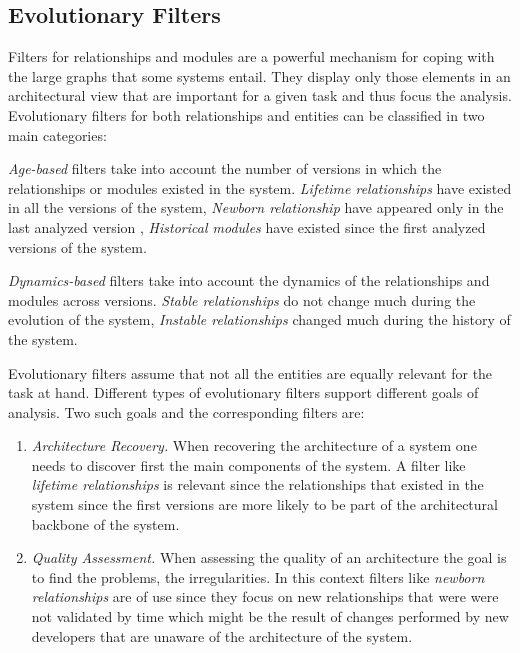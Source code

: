 \documentclass[preprint,12pt]{elsarticle}
\begin{document}
\subsection {Evolutionary Filters}

Filters for relationships and modules are a powerful mechanism for coping with the large graphs that some systems entail. They display only those elements in an architectural view that are important for a given task and thus focus the analysis. Evolutionary filters for both relationships and entities can be classified in two main categories:

\begin{description}
\item {\em Age-based} filters take into account the number of versions in which the relationships or modules existed in the system. {\em Lifetime relationships} have existed in all the versions of the system, {\em Newborn relationship} have appeared only in the last analyzed version \cite{lungu-relevo}, {\em Historical modules} have existed since the first analyzed versions of the system.
\item {\em Dynamics-based} filters take into account the dynamics of the relationships and modules across versions. {\em Stable relationships} do not change much during the evolution of the system, {\em Instable relationships} changed much during the history of the system.
\end{description}

Evolutionary filters assume that not all the entities are equally relevant for the task at hand. Different types of evolutionary filters support different goals of analysis. Two such goals and the corresponding filters are:

\begin{enumerate}

\item {\em Architecture Recovery.} When recovering the architecture of a system one needs to discover first the main components of the system. A filter like {\em lifetime relationships} is relevant since the relationships that existed in the system since the first versions are more likely to be part of the architectural backbone of the system. %

\item {\em Quality Assessment.} When assessing the quality of an architecture the goal is to find the problems, the irregularities. In this context filters like {\em newborn relationships} are of use since they focus on new relationships that were were not validated by time which might be the result of changes performed by new developers that are unaware of the architecture of the system. %

\end{enumerate}
\end{document}
